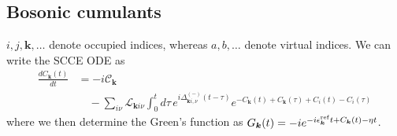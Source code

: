 \subsection{Bosonic cumulants}
$i,j,\bm{k},\ldots$ denote occupied indices, whereas $a,b,\ldots$ denote virtual indices. We can write the SCCE ODE as 
\begin{align}
\frac{dC_{\bm{k}}(t)}{dt}
&=
-i \mathcal{C}_{\bm{k}}
\nonumber\\
&\quad
-
\sum_{i\nu}
\mathcal{L}_{\bm{k}i\nu}
\int_0^t d\tau\,
e^{i\Delta_{\bm{k}i,\nu}^{(-)}(t-\tau)}
e^{
-C_{\bm{k}}(t)
+C_{\bm{k}}(\tau)
+C_i(t)
-C_i(\tau)
}
\end{align}
where we then determine the Green's function as $G_{\bm{k}}(t)=-i e^{-i\epsilon_{\bm{k}}^{\rm ref}t+C_{\bm{k}}(t)-\eta t}$. 

